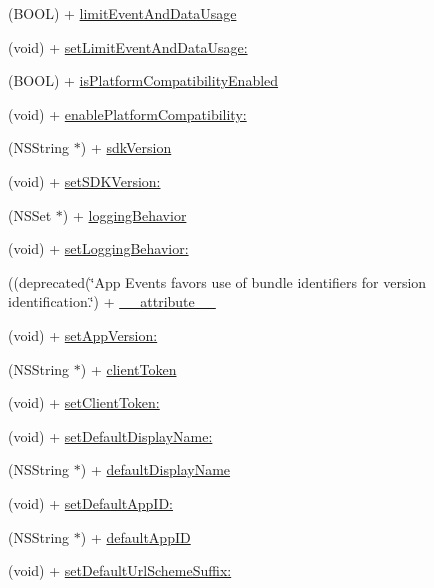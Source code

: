 \begin{DoxyCompactItemize}
(B\+O\+OL) + \hyperlink{interfaceFBSettings_a3a939ba08bcff55d53c8e42f9a9e0234}{limit\+Event\+And\+Data\+Usage}
\item 
(void) + \hyperlink{interfaceFBSettings_ab0e8e19825a865db7cbf58da4957cf40}{set\+Limit\+Event\+And\+Data\+Usage\+:}
\item 
(B\+O\+OL) + \hyperlink{interfaceFBSettings_a257796e070b7f063dedaa95706946134}{is\+Platform\+Compatibility\+Enabled}
\item 
(void) + \hyperlink{interfaceFBSettings_a896c1bdd4227035fba49c90d06c101a2}{enable\+Platform\+Compatibility\+:}
\item 
(N\+S\+String $\ast$) + \hyperlink{interfaceFBSettings_a54528a8eee1469b7202d0e4825f08604}{sdk\+Version}
\item 
(void) + \hyperlink{interfaceFBSettings_afd9810381ac6027e6400879cb68ba46e}{set\+S\+D\+K\+Version\+:}
\item 
(N\+S\+Set $\ast$) + \hyperlink{interfaceFBSettings_a6fe525188c97270c4d4a6781c4d6ee11}{logging\+Behavior}
\item 
(void) + \hyperlink{interfaceFBSettings_aaaf513653d6a8e2d05e0ecea865155c0}{set\+Logging\+Behavior\+:}
\item 
((deprecated(\char`\"{}App Events favors use of bundle identifiers for version identification.\char`\"{}) + \hyperlink{interfaceFBSettings_a2e999eddc513423b7071f27bc09589aa}{\+\_\+\+\_\+attribute\+\_\+\+\_\+}
\item 
(void) + \hyperlink{interfaceFBSettings_a01b8ded28d0bc4e050ff6eccb9a03383}{set\+App\+Version\+:}
\item 
(N\+S\+String $\ast$) + \hyperlink{interfaceFBSettings_afa1e8342398ddbdd7e6e9cd0a28094ac}{client\+Token}
\item 
(void) + \hyperlink{interfaceFBSettings_a07cfc161668c190bf5fd37934821c4de}{set\+Client\+Token\+:}
\item 
(void) + \hyperlink{interfaceFBSettings_a783ff4cf8b998eadfbfe2d95efef24a1}{set\+Default\+Display\+Name\+:}
\item 
(N\+S\+String $\ast$) + \hyperlink{interfaceFBSettings_a64b1fe4c26086a1a2bb5b162815f2786}{default\+Display\+Name}
\item 
(void) + \hyperlink{interfaceFBSettings_aae75641f83b1caf710efd2ce72b6eb67}{set\+Default\+App\+I\+D\+:}
\item 
(N\+S\+String $\ast$) + \hyperlink{interfaceFBSettings_af60cce044316df28d128d64e79a77ba5}{default\+App\+ID}
\item 
(void) + \hyperlink{interfaceFBSettings_a08a9504a71c1c9ec329e97da7c636337}{set\+Default\+Url\+Scheme\+Suffix\+:}

\end{DoxyCompactItemize}
